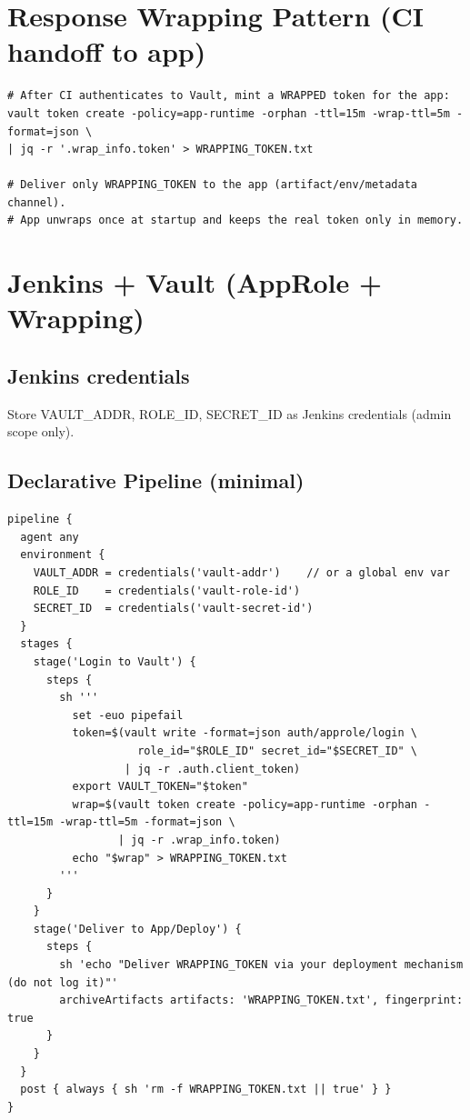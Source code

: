 \documentclass[11pt,letterpaper]{article}
\begin{document}
\section*{Response Wrapping Pattern (CI handoff to app)}
\begin{verbatim}
# After CI authenticates to Vault, mint a WRAPPED token for the app:
vault token create -policy=app-runtime -orphan -ttl=15m -wrap-ttl=5m -format=json \
| jq -r '.wrap_info.token' > WRAPPING_TOKEN.txt

# Deliver only WRAPPING_TOKEN to the app (artifact/env/metadata channel).
# App unwraps once at startup and keeps the real token only in memory.
\end{verbatim}

\section*{Jenkins + Vault (AppRole + Wrapping)}
\subsection*{Jenkins credentials}
Store VAULT\_ADDR, ROLE\_ID, SECRET\_ID as Jenkins credentials (admin scope only).

\subsection*{Declarative Pipeline (minimal)}
\begin{verbatim}
pipeline {
  agent any
  environment {
    VAULT_ADDR = credentials('vault-addr')    // or a global env var
    ROLE_ID    = credentials('vault-role-id')
    SECRET_ID  = credentials('vault-secret-id')
  }
  stages {
    stage('Login to Vault') {
      steps {
        sh '''
          set -euo pipefail
          token=$(vault write -format=json auth/approle/login \
                    role_id="$ROLE_ID" secret_id="$SECRET_ID" \
                  | jq -r .auth.client_token)
          export VAULT_TOKEN="$token"
          wrap=$(vault token create -policy=app-runtime -orphan -ttl=15m -wrap-ttl=5m -format=json \
                 | jq -r .wrap_info.token)
          echo "$wrap" > WRAPPING_TOKEN.txt
        '''
      }
    }
    stage('Deliver to App/Deploy') {
      steps {
        sh 'echo "Deliver WRAPPING_TOKEN via your deployment mechanism (do not log it)"'
        archiveArtifacts artifacts: 'WRAPPING_TOKEN.txt', fingerprint: true
      }
    }
  }
  post { always { sh 'rm -f WRAPPING_TOKEN.txt || true' } }
}
\end{verbatim}
\clearpage
\end{document}

